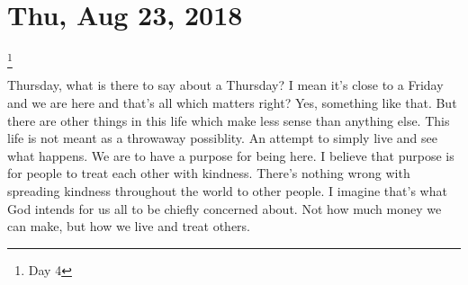 \section{Thu, Aug 23, 2018}\footnote{Day 4}

Thursday, what is there to say about a Thursday? I mean it's close to a Friday and we
are here and that's all which matters right? Yes, something like that. But there are
other things in this life which make less sense than anything else. This life is not
meant as a throwaway possiblity. An attempt to simply live and see what happens. We
are to have a purpose for being here. I believe that purpose is for people to treat
each other with kindness. There's nothing wrong with spreading kindness throughout
the world to other people. I imagine that's what God intends for us all to be chiefly
concerned about. Not how much money we can make, but how we live and treat others.